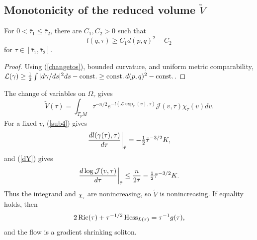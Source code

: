 \subsection{Monotonicity of the reduced volume $\widetilde V$} \label{monoV}
\begin{lemma}
  \label{lem:kl-monotonicity-reduced-volume-estimates-reduced-volume}
  \label{lowerbound}
For $0<\bar\tau_1\le\bar\tau_2$, there are $C_1,C_2>0$ such that
\begin{equation}\label{lbound}l(q,\tau)\ge C_1d(p,q)^2-C_2\end{equation}
for $\tau\in[\bar\tau_1,\bar\tau_2]$.
\end{lemma}
\begin{proof}
\sketch
Using (\ref{changetos}), bounded curvature, and uniform metric comparability,
${\mathcal L}(\gamma)\ge\frac12\int|d\gamma/ds|^2ds-\operatorname{const.}\ge\operatorname{const.} d(p,q)^2-\operatorname{const.}$.
\end{proof}

The change of variables on $\Omega_\tau$ gives
\begin{equation}
\tilde V(\tau)=\int_{T_pM}\tau^{-n/2}e^{-l({\mathcal L}\exp_\tau(v),\tau)}
{\mathcal J}(v,\tau)\chi_\tau(v)dv.
\end{equation}
For a fixed $v$, (\ref{sub4}) gives
\begin{equation}\label{bbound1}{dl(\gamma(\tau),\tau)\over d\tau}\bigg|_{\bar\tau}=-\tfrac12\bar\tau^{-3/2}K,
\end{equation}
and (\ref{dY}) gives
\begin{equation}\label{bbound2}{d\log{\mathcal J}(v,\tau)\over d\tau}\bigg|_{\bar\tau}
\le {n\over2\bar\tau}-\tfrac12\bar\tau^{-3/2}K.
\end{equation}
Thus the integrand and $\chi_\tau$ are nonincreasing, so $\tilde V$ is nonincreasing.
If equality holds, then
\begin{equation}2\operatorname{Ric}(\tau)+\tau^{-1/2}\operatorname{Hess}_{L(\tau)}=\tau^{-1}g(\tau),\end{equation}
and the flow is a gradient shrinking soliton.

